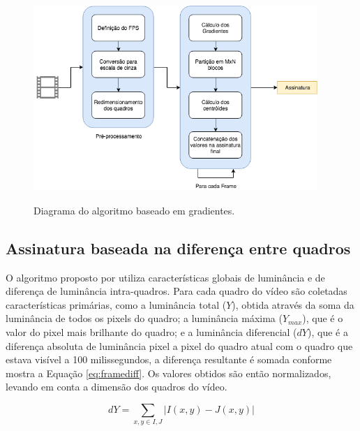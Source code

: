  \begin{figure}[h]
      \centering
      \caption{Diagrama do algoritmo baseado em gradientes.}
      \includegraphics[width=0.96\textwidth]{dados/figuras/diagramas/Diag-Gradiente}
       	\label{fig:dia_gradiente}
    \end{figure}  
    
%
%

\subsection{Assinatura baseada na diferença entre quadros}
\label{sec:framediff}

  O algoritmo proposto por  utiliza características globais de luminância e de diferença de luminância intra-quadros. Para cada quadro do vídeo são coletadas características primárias, como a luminância total ($Y$), obtida através da soma da luminância de todos os pixels do quadro; a luminância máxima ($Y_{max}$), que é o valor do pixel mais brilhante do quadro; e a luminância diferencial ($dY$), que é a diferença absoluta de luminância pixel a pixel do quadro atual com o quadro que estava visível a 100 milissegundos, a diferença resultante é somada conforme mostra a Equação \ref{eq:framediff}. Os valores obtidos são então normalizados, levando em conta a dimensão dos quadros do vídeo.
  
\begin{equation}
	\label{eq:framediff}
	dY = \sum_{x,y \in  I,J} |I(x,y) - J(x,y)|
\end{equation} 

